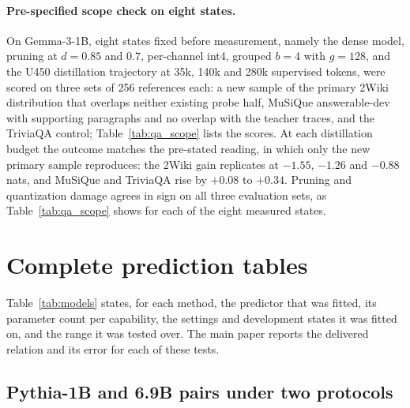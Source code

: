 \paragraph{Pre-specified scope check on eight states.} On Gemma-3-1B,
eight states fixed before measurement, namely the dense model, pruning at $d=0.85$ and $0.7$, per-channel int4, grouped $b=4$ with $g=128$, and the U450 distillation trajectory at 35k, 140k and 280k supervised tokens, were scored on three sets of 256 references each: a new sample of the
primary 2Wiki distribution that overlaps neither existing probe half,
MuSiQue answerable-dev with supporting paragraphs and no overlap with the teacher traces, and the TriviaQA control; Table~\ref{tab:qa_scope} lists the scores. At
each distillation budget the outcome matches the pre-stated reading, in
which only the new primary sample reproduces: the 2Wiki gain replicates at $-1.55$, $-1.26$ and $-0.88$ nats, and MuSiQue and TriviaQA rise by $+0.08$ to $+0.34$.
Pruning and quantization damage agrees in sign on all three evaluation sets, as Table~\ref{tab:qa_scope} shows for each of the eight measured states.



\FloatBarrier

\section{Complete prediction tables}
\label{sec:supp_results}

Table~\ref{tab:models} states, for each method, the predictor that was fitted, its parameter
count per capability, the settings and development states it was fitted on, and the range it was
tested over. The main paper reports the delivered relation and its error for each of these tests.
\begin{retargetreferences}{%
}

\end{retargetreferences}






\subsection{Pythia-1B and 6.9B pairs under two protocols}
\label{sec:app_p1v2}

